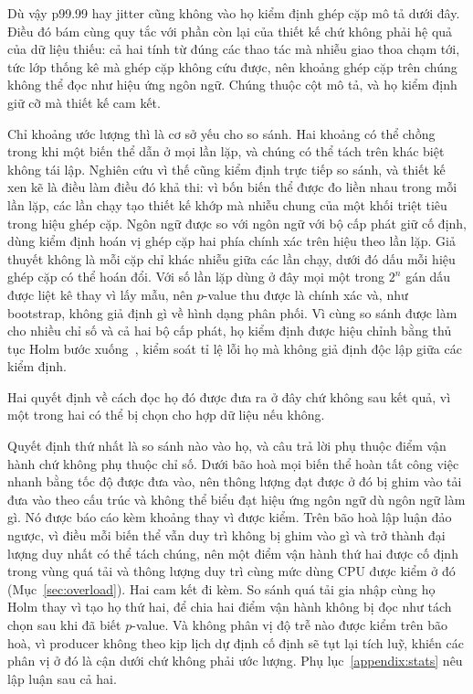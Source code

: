 Dù vậy p99.99 hay jitter cũng không vào họ kiểm định ghép cặp mô tả dưới đây. Điều đó bám cùng
quy tắc với phần còn lại của thiết kế chứ không phải hệ quả của dữ liệu thiếu: cả hai tính từ
đúng các thao tác mà nhiễu giao thoa chạm tới, tức lớp thống kê mà ghép cặp không cứu được, nên
khoảng ghép cặp trên chúng không thể đọc như hiệu ứng ngôn ngữ. Chúng thuộc cột mô tả, và họ
kiểm định giữ cỡ mà thiết kế cam kết.

Chỉ khoảng ước lượng thì là cơ sở yếu cho so sánh. Hai khoảng có thể chồng trong khi một biến thể
dẫn ở mọi lần lặp, và chúng có thể tách trên khác biệt không tái lập. Nghiên cứu vì thế cũng
kiểm định trực tiếp so sánh, và thiết kế xen kẽ là điều làm điều đó khả thi: vì bốn biến thể
được đo liền nhau trong mỗi lần lặp, các lần chạy tạo thiết kế khớp mà nhiễu chung của một khối
triệt tiêu trong hiệu ghép cặp. Ngôn ngữ được so với ngôn ngữ với bộ cấp phát giữ cố định, dùng
kiểm định hoán vị ghép cặp hai phía chính xác trên hiệu theo lần lặp. Giả thuyết không là mỗi cặp
chỉ khác nhiễu giữa các lần chạy, dưới đó dấu mỗi hiệu ghép cặp có thể hoán đổi. Với số lần lặp
dùng ở đây mọi một trong $2^{n}$ gán dấu được liệt kê thay vì lấy mẫu, nên $p$-value thu được là
chính xác và, như bootstrap, không giả định gì về hình dạng phân phối. Vì cùng so sánh được làm
cho nhiều chỉ số và cả hai bộ cấp phát, họ kiểm định được hiệu chỉnh bằng thủ tục Holm bước
xuống~\cite{holm1979simple}, kiểm soát tỉ lệ lỗi họ mà không giả định độc lập giữa các kiểm định.

Hai quyết định về cách đọc họ đó được đưa ra ở đây chứ không sau kết quả, vì một trong hai có thể
bị chọn cho hợp dữ liệu nếu không.

Quyết định thứ nhất là so sánh nào vào họ, và câu trả lời phụ thuộc điểm vận hành chứ không phụ
thuộc chỉ số. Dưới bão hoà mọi biến thể hoàn tất công việc nhanh bằng tốc độ được đưa vào, nên
thông lượng đạt được ở đó bị ghim vào tải đưa vào theo cấu trúc và không thể biểu đạt hiệu ứng
ngôn ngữ dù ngôn ngữ làm gì. Nó được báo cáo kèm khoảng thay vì được kiểm. Trên bão hoà lập luận
đảo ngược, vì điều mỗi biến thể vẫn duy trì không bị ghim vào gì và trở thành đại lượng duy nhất
có thể tách chúng, nên một điểm vận hành thứ hai được cố định trong vùng quá tải và thông lượng
duy trì cùng mức dùng CPU được kiểm ở đó (Mục~\ref{sec:overload}). Hai cam kết đi kèm. So sánh
quá tải gia nhập cùng họ Holm thay vì tạo họ thứ hai, để chia hai điểm vận hành không bị đọc như
tách chọn sau khi đã biết $p$-value. Và không phân vị độ trễ nào được kiểm trên bão hoà, vì
producer không theo kịp lịch dự định cố định sẽ tụt lại tích luỹ, khiến các phân vị ở đó là cận
dưới chứ không phải ước lượng. Phụ lục~\ref{appendix:stats} nêu lập luận sau cả hai.

